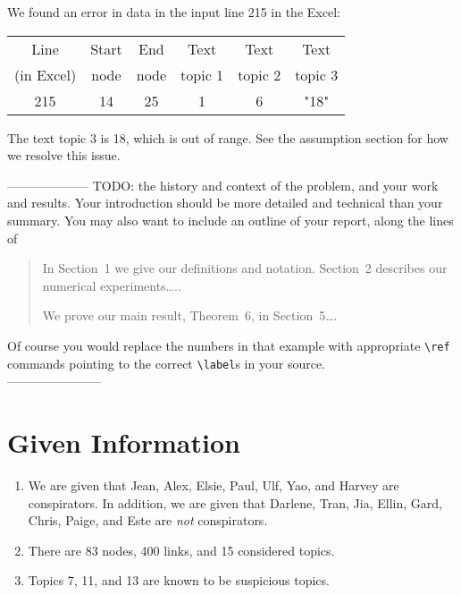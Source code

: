 \documentclass{icmmcm}
\begin{document}
We found an error in data in the input line 215 in the Excel:

\begin{center}	  	
\begin{tabular}{|c|c|c|c|c|c|}	  	
\hline	  	
Line    & Start  & End  & Text   & Text       & Text \\	  	
(in Excel)&  node & node & topic 1 &  topic 2 & topic 3 \\	  	
\hline  	
215 &  14 & 25 &  1  &   6      &      "18"  \\  	
\hline  	
\end{tabular}  	
\end{center}

The text topic 3 is 18, which is out of range.
See the assumption section for how we resolve this issue.

\noindent -------------------- TODO:
the history and context of the problem,
and your work and results.  Your introduction should be more detailed
and technical than your summary.  You may also want to include an
outline of your report, along the lines of
\begin{quotation}
  In Section~1 we give our definitions and notation. Section~2
  describes our numerical experiments\ldots{}..
  
  We prove our main result, Theorem~6, in Section~5\ldots{}.
\end{quotation}
Of course you would replace the numbers in that example with
appropriate \verb|\ref| commands pointing to the correct
\verb|\label|s in your source.\\
-----------------------

\section{Given Information}
\begin{enumerate}
\item We are given that Jean, Alex, Elsie, Paul, Ulf, Yao,
and Harvey are conspirators. In addition, we are given that Darlene, Tran, Jia, Ellin, Gard, Chris,
Paige, and Este are \textit{not} conspirators.
\label{known_cons}
\item There are 83 nodes, 400 links, and 15 considered topics.\label{number}
\item Topics 7, 11, and 13 are known to be suspicious topics. \label{known_sus_topics}
\end{enumerate}
\end{document}
